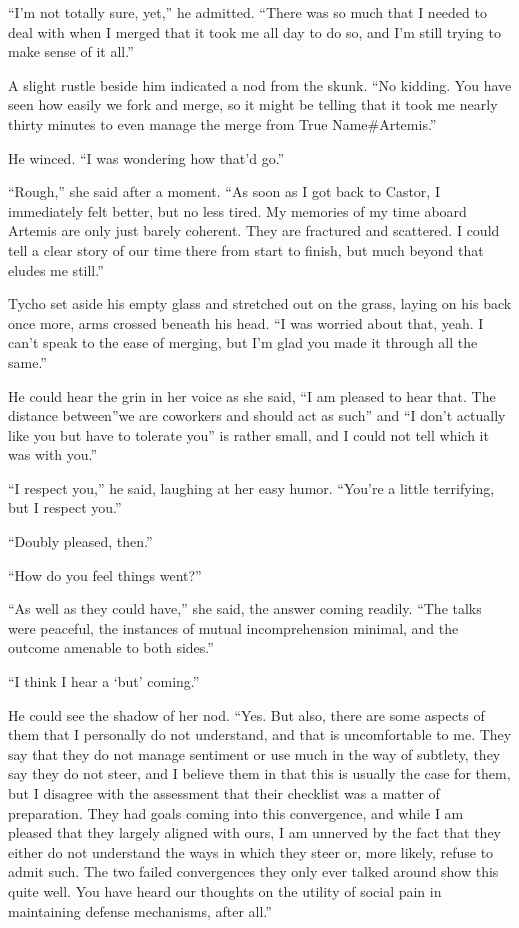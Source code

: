``I'm not totally sure, yet,'' he admitted. ``There was so much that I needed to deal with when I merged that it took me all day to do so, and I'm still trying to make sense of it all.''

A slight rustle beside him indicated a nod from the skunk. ``No kidding. You have seen how easily we fork and merge, so it might be telling that it took me nearly thirty minutes to even manage the merge from True Name\#Artemis.''

He winced. ``I was wondering how that'd go.''

``Rough,'' she said after a moment. ``As soon as I got back to Castor, I immediately felt better, but no less tired. My memories of my time aboard Artemis are only just barely coherent. They are fractured and scattered. I could tell a clear story of our time there from start to finish, but much beyond that eludes me still.''

Tycho set aside his empty glass and stretched out on the grass, laying on his back once more, arms crossed beneath his head. ``I was worried about that, yeah. I can't speak to the ease of merging, but I'm glad you made it through all the same.''

He could hear the grin in her voice as she said, ``I am pleased to hear that. The distance between''we are coworkers and should act as such'' and ``I don't actually like you but have to tolerate you'' is rather small, and I could not tell which it was with you.''

``I respect you,'' he said, laughing at her easy humor. ``You're a little terrifying, but I respect you.''

``Doubly pleased, then.''

``How do you feel things went?''

``As well as they could have,'' she said, the answer coming readily. ``The talks were peaceful, the instances of mutual incomprehension minimal, and the outcome amenable to both sides.''

``I think I hear a `but' coming.''

He could see the shadow of her nod. ``Yes. But also, there are some aspects of them that I personally do not understand, and that is uncomfortable to me. They say that they do not manage sentiment or use much in the way of subtlety, they say they do not steer, and I believe them in that this is usually the case for them, but I disagree with the assessment that their checklist was a matter of preparation. They had goals coming into this convergence, and while I am pleased that they largely aligned with ours, I am unnerved by the fact that they either do not understand the ways in which they steer or, more likely, refuse to admit such. The two failed convergences they only ever talked around show this quite well. You have heard our thoughts on the utility of social pain in maintaining defense mechanisms, after all.''

